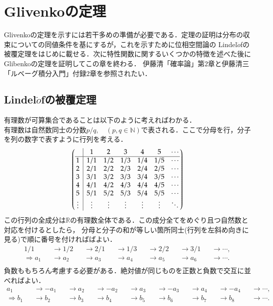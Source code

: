 \documentclass[a4j,papersize,disablejfam,slide,14pt]{jsarticle}
\begin{document}
\section{{\rm Glivenko}の定理}
\label{sec:glivenko_theorem}
	{\rm Glivenko}の定理を示すには若干多めの準備が必要である．定理の証明は分布の収束についての同値条件を基にするが，これを示すために位相空間論の
    {\rm Lindel$\ddot{o}$f}の被覆定理をはじめに載せる．次に特性関数に関するいくつかの特徴を述べた後に{\rm Glibenko}の定理を証明してこの章を終わる．
    伊藤清「確率論」第$2$章と伊藤清三「ルベーグ積分入門」付録$2$章を参照されたい．
\subsection{{\rm Lindel$\ddot{o}$f}の被覆定理}
	有理数が可算集合であることは以下のように考えればわかる．\\
    有理数は自然数同士の分数$p/q,\quad (p,q \in \mathbb{N})$で表される．ここで分母を行，分子を列の数字で表すように行列を考える．
    \begin{align}
    \arraycolsep5pt
    	\left(
    	\begin{array}{@{\,}c|cccccc@{\,}}
    		&1&2&3&4&5&\cdots\\
    		\hline
    		1&1/1&1/2&1/3&1/4&1/5&\cdots\\
    		2&2/1&2/2&2/3&2/4&2/5&\cdots\\
    		3&3/1&3/2&3/3&3/4&3/5&\cdots\\
    		4&4/1&4/2&4/3&4/4&4/5&\cdots\\
    		5&5/1&5/2&5/3&5/4&5/5&\cdots\\
    		\vdots&\vdots&\vdots&\vdots&\vdots&\vdots&\ddots\\
    	\end{array}
    	\right)
    \end{align}
    この行列の全成分は$\mathbb{R}$の有理数全体である．この成分全てをめぐり且つ自然数と対応を付けるとしたら，
    分母と分子の和が等しい箇所同士(行列を左斜め向きに見る)で順に番号を付ければばよい．
    \begin{align}
    	1/1 &&\to 1/2 &&\to 2/1 &&\to 1/3 &&\to 2/2 &&\to 3/1 &&\to \cdots, \\
        \Rightarrow a_1 &&\to a_2 &&\to a_3 &&\to a_4 &&\to a_5 &&\to a_6 &&\to \cdots. \\
    \end{align}
    負数ももちろん考慮する必要がある．絶対値が同じものを正数と負数で交互に並べればよい．
    \begin{align}
        a_1 &&\to -a_1 &&\to a_2 &&\to -a_2 &&\to a_3 &&\to -a_3 &&\to a_4 &&\to -a_4 &&\to \cdots,\\
        \Rightarrow b_1 &&\to b_2 &&\to b_3 &&\to b_4 &&\to b_5 &&\to b_6 &&\to b_7 &&\to b_8 &&\to \cdots.
    \end{align}
\end{document}

